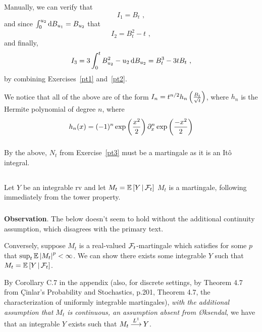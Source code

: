 \documentclass{article}
\begin{document}
\subsubsection{}

Manually, we can verify that
\[
I_1=B_t\,\,,
\]
and since \(\int_0^{u_2}\mathop{\mathrm{d} B_{u_1} }=B_{u_2}\) that
\[
  I_2=B_t^2-t\,\,,
\]
and finally,
\[
  I_3=3 \int_0^{t}B_{u_2}^2-u_2\mathop{\mathrm{d} B_{u_2} }=B_t^3-3tB_t\,\,,
\]
by combining Exercises~\ref{pt1} and~\ref{pt2}.

We notice that all of the above are of the form \(I_n=t^{n/2}h_n\left({\frac{B_t}{\sqrt{t}}}\right)\), where \(h_n\) is the Hermite polynomial of degree \(n\), where
\[
  h_n(x)=(-1)^n\exp\left({\frac{x^2}{2}}\right)\partial_x^n\exp\left({\frac{-x^2}{2}}\right)
\]
\subsubsection{}

By the above, \(N_t\) from Exercise~\ref{pt3} must be a martingale as it is an It\^{o} integral.

\subsection{}


\subsubsection{}
Let \(Y\) be an integrable rv and let \(M_t=\operatorname{\mathbb{E}}\left[ Y \,\middle|\, \mathcal{F}_t \right]\)
\(M_t\) is a martingale, following immediately from the tower property.
\subsubsection{}

\textbf{Observation}. The below doesn't seem to hold without the additional continuity assumption, which disagrees with the primary text.

Conversely, suppose \(M_t\) is a real-valued \(\mathcal{F}_t\)-martingale which satisfies for some \(p\) that \(\sup_t\operatorname{\mathbb{E}}\left\lvert{M_t}\right\rvert^p<\infty\). We can show there exists some integrable \(Y\) such that \(M_t=\operatorname{\mathbb{E}}\left[ Y \,\middle|\, \mathcal{F}_t \right]\).

By Corollary C.7 in the appendix (also, for discrete settings, by Theorem 4.7 from \c{C}inlar's Probability and Stochastics,  p.201, Theorem 4.7, the characterization of uniformly integrable martingales), {\em with the additional assumption that \(M_t\) is continuous, an assumption absent from {\O}ksendal}, we have that an integrable \(Y\) exists such that \(M_t\mathbin{\overset{ L^1 }{\longrightarrow}}Y\).
\end{document}
